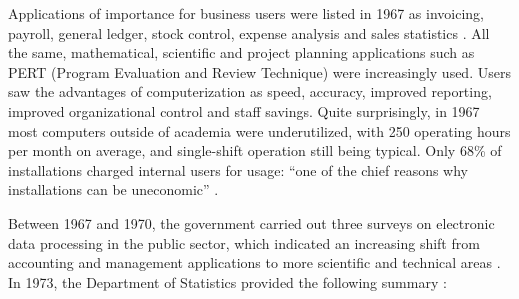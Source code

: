 \documentclass{IEEEcsmag}
\begin{document}
Applications of importance for business users were listed in 1967 as invoicing, payroll, general ledger, stock control, expense analysis and sales statistics \cite{ScottSurvey1967}. All the same, mathematical, scientific and project planning applications such as PERT (Program Evaluation and Review Technique) were increasingly used. Users saw the advantages of computerization as speed, accuracy, improved reporting, improved organizational control and staff savings. Quite surprisingly, in 1967 most computers outside of academia were underutilized, with 250 operating hours per month on average, and single-shift operation still being typical. Only 68\% of installations charged internal users for usage: “one of the chief reasons why installations can be uneconomic” \cite{ScottSurvey1967}.

Between 1967 and 1970, the government carried out three surveys on electronic data processing in the public sector, which indicated an increasing shift from accounting and management applications to more scientific and technical areas \cite{Lythgoe-1970}. 
In 1973, the Department of Statistics provided the following summary \cite{Yearbook73}:

\begin{quotation}
\end{quotation}

\end{document}
